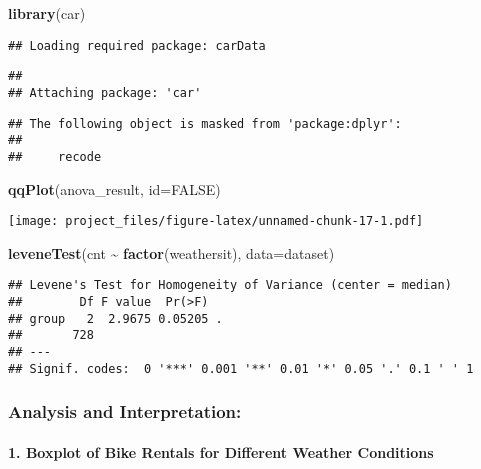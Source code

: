 \documentclass[
]{article}
\newenvironment{Shaded}{\begin{snugshade}}{\end{snugshade}}
\newcommand{\AttributeTok}[1]{\textcolor[rgb]{0.13,0.29,0.53}{#1}}
\newcommand{\ConstantTok}[1]{\textcolor[rgb]{0.56,0.35,0.01}{#1}}
\newcommand{\FunctionTok}[1]{\textcolor[rgb]{0.13,0.29,0.53}{\textbf{#1}}}
\newcommand{\NormalTok}[1]{#1}
\newcommand{\SpecialCharTok}[1]{\textcolor[rgb]{0.81,0.36,0.00}{\textbf{#1}}}
\begin{document}
\begin{Shaded}
\begin{Highlighting}[]
\FunctionTok{library}\NormalTok{(car)}
\end{Highlighting}
\end{Shaded}

\begin{verbatim}
## Loading required package: carData
\end{verbatim}

\begin{verbatim}
## 
## Attaching package: 'car'
\end{verbatim}

\begin{verbatim}
## The following object is masked from 'package:dplyr':
## 
##     recode
\end{verbatim}

\begin{Shaded}
\begin{Highlighting}[]
\FunctionTok{qqPlot}\NormalTok{(anova\_result, }\AttributeTok{id=}\ConstantTok{FALSE}\NormalTok{)}
\end{Highlighting}
\end{Shaded}

\texttt{[image: project\_files/figure-latex/unnamed-chunk-17-1.pdf]}

\begin{Shaded}
\begin{Highlighting}[]
\FunctionTok{leveneTest}\NormalTok{(cnt }\SpecialCharTok{\textasciitilde{}} \FunctionTok{factor}\NormalTok{(weathersit), }\AttributeTok{data=}\NormalTok{dataset)}
\end{Highlighting}
\end{Shaded}

\begin{verbatim}
## Levene's Test for Homogeneity of Variance (center = median)
##        Df F value  Pr(>F)  
## group   2  2.9675 0.05205 .
##       728                  
## ---
## Signif. codes:  0 '***' 0.001 '**' 0.01 '*' 0.05 '.' 0.1 ' ' 1
\end{verbatim}

\subsubsection{\texorpdfstring{\textbf{Analysis and
Interpretation:}}{Analysis and Interpretation:}}\label{analysis-and-interpretation}

\paragraph{1. Boxplot of Bike Rentals for Different Weather
Conditions}\label{boxplot-of-bike-rentals-for-different-weather-conditions}
\end{document}

